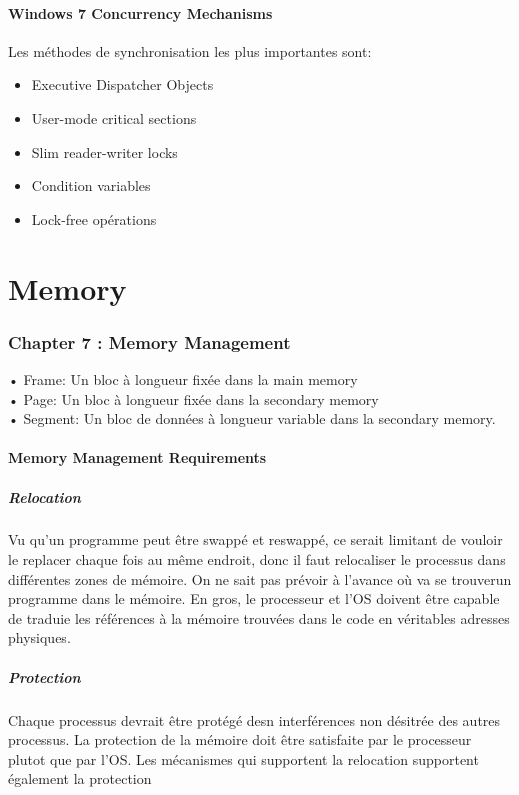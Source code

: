 \subsection{Windows 7 Concurrency Mechanisms}
Les méthodes de synchronisation les plus importantes sont:
\begin{itemize}
  \item Executive Dispatcher Objects
  \item User-mode critical sections
  \item Slim reader-writer locks
  \item Condition variables
  \item Lock-free opérations
\end{itemize}

\newpage
\part{Memory}


\section{Chapter 7 : Memory Management}
• Frame: Un bloc à longueur fixée dans la main memory \\
• Page: Un bloc à longueur fixée dans la secondary memory \\
• Segment: Un bloc de données à longueur variable dans la secondary memory.
\\
\subsection{Memory Management Requirements}
\subsubsection{Relocation}
Vu qu'un programme peut être swappé et reswappé, ce serait limitant de vouloir le replacer chaque fois au même endroit, donc il faut relocaliser le processus dans différentes zones de mémoire.
On ne sait pas prévoir à l'avance où va se trouverun programme dans le mémoire.
En gros, le processeur et l'OS doivent être capable de traduie les références à la mémoire trouvées dans le code en véritables adresses physiques.
\subsubsection{Protection}
Chaque processus devrait être protégé desn interférences non désitrée des autres processus.
La protection de la mémoire doit être satisfaite par le processeur plutot que par l'OS.
Les mécanismes qui supportent la relocation supportent également la protection
